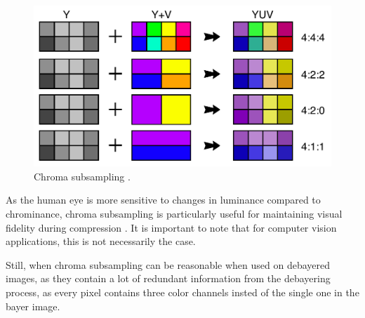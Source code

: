 \begin{figure}[H]
    \centering
    \includegraphics[width=.8\textwidth]{figures/debayer/chroma_subsampling.pdf}
    \caption{Chroma subsampling \cite{stevo-88EnglishMostWidely2010}.}
    \label{fig:ycbcr_example}
\end{figure}

As the human eye is more sensitive to changes in luminance compared to chrominance, chroma subsampling is particularly useful for maintaining visual fidelity during compression \cite{lambWhyRodsCones2016}.
It is important to note that for computer vision applications, this is not necessarily the case.

Still, when chroma subsampling can be reasonable when used on debayered images, as they contain a lot of redundant information from the debayering process, as every pixel contains three color channels insted of the single one in the bayer image.


